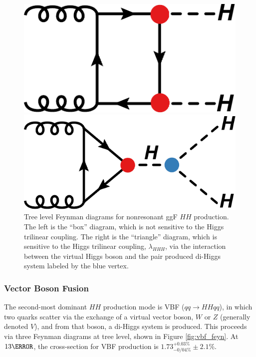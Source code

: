 \begin{figure}[!thp]
    \centering
    \begin{minipage}[c]{.40\textwidth}
        \includegraphics[width=\textwidth]{chapters/chapter1_theory/images/hh_box.pdf}
    \end{minipage}
    \hspace{0.09\textwidth}
    \begin{minipage}[c]{.40\textwidth}
        \includegraphics[width=\textwidth]{chapters/chapter1_theory/images/hh_triangle.pdf}
    \end{minipage}

    \caption[Tree level Feynman diagrams for nonresonant \gls{ggF} $HH$ production.]{Tree level Feynman diagrams for nonresonant \gls{ggF} $HH$ production. The left is the ``box'' diagram, which is not sensitive to the Higgs trilinear coupling. The right is the ``triangle'' diagram, which is sensitive to the Higgs trilinear coupling, $\lambda_{HHH}$, via the interaction between the virtual Higgs boson and the pair produced di-Higgs system labeled by the blue vertex.}
    \label{fig:ggf_feyn}
\end{figure}

\subsubsection{Vector Boson Fusion} \label{sssec:vbfHH}
The second-most dominant $HH$ production mode is \gls{VBF} ($qq \rightarrow HHqq$), in which two quarks scatter via the exchange of a virtual vector boson, $W$ or $Z$ (generally denoted $V$), and from that boson, a di-Higgs system is produced. This proceeds via three Feynman diagrams at tree level, shown in Figure \ref{fig:vbf_feyn}. At $\unit{13}{\TeV}$, the cross-section for \gls{VBF} production is $1.73^{+0.03\%}_{-0/04\%} \pm 2.1\%$\cite{hh-crosssections}.

